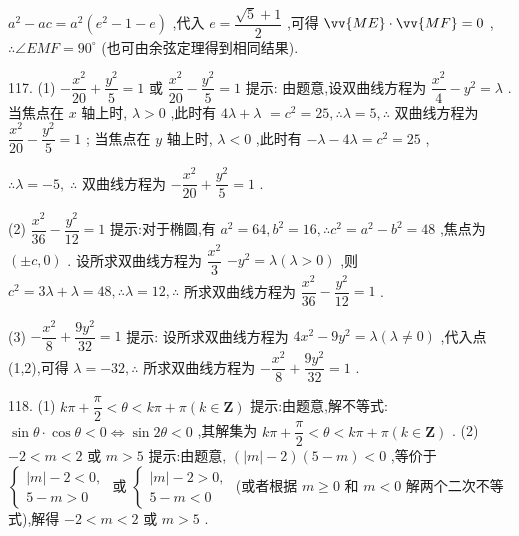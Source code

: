 ${a}^{2} - {ac} = {a}^{2}\left( {{e}^{2} - 1 - e}\right)$ ,代入 $e = \dfrac{\sqrt{5} + 1}{2}$ ,可得 $\vv{ME} \cdot  \vv{MF} = 0$ , $\therefore \angle {EMF} = {90}^{ \circ  }$ (也可由余弦定理得到相同结果).

117. (1) $- \dfrac{{x}^{2}}{20} + \dfrac{{y}^{2}}{5} = 1$ 或 $\dfrac{{x}^{2}}{20} - \dfrac{{y}^{2}}{5} = 1$ 提示: 由题意,设双曲线方程为 $\dfrac{{x}^{2}}{4} - {y}^{2} = \lambda$ . 当焦点在 $x$ 轴上时, $\lambda  > 0$ ,此时有 ${4\lambda } + \lambda$  $= {c}^{2} = {25},\therefore \lambda  = 5,\therefore$ 双曲线方程为 $\dfrac{{x}^{2}}{20} - \dfrac{{y}^{2}}{5} = 1$ ; 当焦点在 $y$ 轴上时, $\lambda  < 0$ ,此时有 $- \lambda  - {4\lambda } = {c}^{2} = {25}$ ,

$\therefore \lambda  =  - 5,\;\therefore$ 双曲线方程为 $- \dfrac{{x}^{2}}{20} + \dfrac{{y}^{2}}{5} = 1$ .

(2) $\dfrac{{x}^{2}}{36} - \dfrac{{y}^{2}}{12} = 1$ 提示:对于椭圆,有 ${a}^{2} = {64},{b}^{2} = {16},\therefore {c}^{2} = {a}^{2} - {b}^{2} = {48}$ ,焦点为 $\left( {\pm c,0}\right)$ . 设所求双曲线方程为 $\dfrac{{x}^{2}}{3}$  $- {y}^{2} = \lambda \left( {\lambda  > 0}\right)$ ,则 ${c}^{2} = {3\lambda } + \lambda  = {48},\therefore \lambda  = {12},\therefore$ 所求双曲线方程为 $\dfrac{{x}^{2}}{36} - \dfrac{{y}^{2}}{12} = 1$ .

(3) $- \dfrac{{x}^{2}}{8} + \dfrac{9{y}^{2}}{32} = 1$ 提示: 设所求双曲线方程为 $4{x}^{2} - 9{y}^{2} = \lambda \left( {\lambda  \neq  0}\right)$ ,代入点(1,2),可得 $\lambda  =  - {32},\therefore$ 所求双曲线方程为 $- \dfrac{{x}^{2}}{8} + \dfrac{9{y}^{2}}{32} = 1$ .

118. (1) ${k\pi } + \dfrac{\pi }{2} < \theta  < {k\pi } + \pi \left( {k \in  \mathbf{Z}}\right)$ 提示:由题意,解不等式: $\sin \theta  \cdot  \cos \theta  < 0 \Leftrightarrow  \sin {2\theta } < 0$ ,其解集为 ${k\pi } + \dfrac{\pi }{2} < \theta  < {k\pi } + \pi \left( {k \in  \mathbf{Z}}\right)$ . (2) $- 2 < m < 2$ 或 $m > 5$ 提示:由题意, $\left( {\left| m\right|  - 2}\right) \left( {5 - m}\right)  < 0$ ,等价于 $\left\{  \begin{array}{l} \left| m\right|  - 2 < 0, \\  5 - m > 0 \end{array}\right.$ 或 $\left\{  \begin{array}{l} \left| m\right|  - 2 > 0, \\  5 - m < 0 \end{array}\right.$ (或者根据 $m \geq  0$ 和 $m < 0$ 解两个二次不等式),解得 $- 2 < m < 2$ 或 $m > 5$ .

